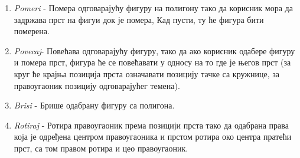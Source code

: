 \begin{enumerate}
\item  \emph{Pomeri} - Помера одговарајућу фигуру на полигону тако да корисник мора да задржава прст на фигуи док је помера, Кад пусти, ту ће фигура бити померена. 
\item  \emph{Povecaj}- Повећава одговарајућу фигуру, тако да ако корисник одабере фигуру и помера прст, фигура ће се повећавати у односу на то где је његов прст (за круг ће крајња позиција прста означавати позицију тачке са кружнице, за правоугаоник позицију одговарајућег темена).
\item  \emph{Brisi} - Брише  одабрану фигуру са полигона.
\item  \emph{Rotiraj} - Ротира правоугаоник према позицији прста тако да одабрана права која је одређена центром правоугаоника и прстом ротира око центра пратећи прст, са том правом ротира и цео правоугаоник. 
\end{enumerate}

